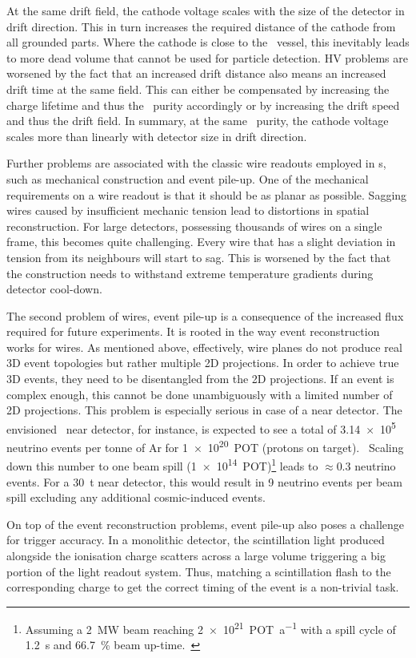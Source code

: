 At the same drift field, the cathode voltage scales with the size of the detector in drift direction.
This in turn increases the required distance of the cathode from all grounded parts.
Where the cathode is close to the \lar\ vessel, this inevitably leads to more dead volume that cannot be used for particle detection.
HV problems are worsened by the fact that an increased drift distance also means an increased drift time at the same field.
This can either be compensated by increasing the charge lifetime and thus the \lar\ purity accordingly or by increasing the drift speed and thus the drift field.
In summary, at the same \lar\ purity, the cathode voltage scales more than linearly with detector size in drift direction.

Further problems are associated with the classic wire readouts employed in \lartpc s, such as mechanical construction and event pile-up.
One of the mechanical requirements on a wire readout is that it should be as planar as possible.
Sagging wires caused by insufficient mechanic tension lead to distortions in spatial reconstruction.
For large detectors, possessing thousands of wires on a single frame, this becomes quite challenging.
Every wire that has a slight deviation in tension from its neighbours will start to sag.
This is worsened by the fact that the construction needs to withstand extreme temperature gradients during detector cool-down.

The second problem of wires, event pile-up is a consequence of the increased flux required for future experiments.
It is rooted in the way event reconstruction works for wires.
As mentioned above, effectively, wire planes do not produce real 3D event topologies but rather multiple 2D projections.
In order to achieve true 3D events, they need to be disentangled from the 2D projections.
If an event is complex enough, this cannot be done unambiguously with a limited number of 2D projections.
This problem is especially serious in case of a near detector.
The envisioned \dune\ near detector, for instance, is expected to see a total of \num{3.14e5} neutrino events per tonne of Ar for \SI{1e20}{POT} (protons on target).~\cite{dune2}
Scaling down this number to one beam spill (\SI{1e14}{POT})\footnote{Assuming a \SI{2}{\mega\watt} beam reaching \SI{2e21}{POT\per a} with a spill cycle of \SI{1.2}{\second} and \SI{66.7}{\percent} beam up-time.~\cite{dune2, dune4}} leads to $\approx \num{0.3}$ neutrino events.
For a \SI{30}{\tonne} near detector, this would result in \num{9} neutrino events per beam spill excluding any additional cosmic-induced events.

On top of the event reconstruction problems, event pile-up also poses a challenge for trigger accuracy.
In a monolithic detector, the scintillation light produced alongside the ionisation charge scatters across a large volume triggering a big portion of the light readout system.
Thus, matching a scintillation flash to the corresponding charge to get the correct timing of the event is a non-trivial task.